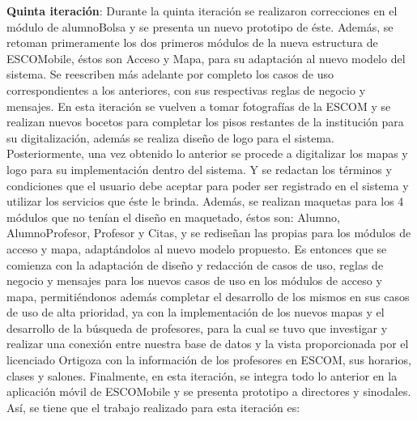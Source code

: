 \noindent
\newline
\textbf{Quinta iteración}: Durante la quinta iteración se realizaron correcciones en el módulo de alumnoBolsa y se presenta un nuevo prototipo de éste. Además, se retoman primeramente los dos primeros módulos de la nueva estructura de ESCOMobile, éstos son Acceso y Mapa, para su adaptación al nuevo modelo del sistema. Se reescriben más adelante por completo los casos de uso correspondientes a los anteriores, con sus respectivas reglas de negocio y mensajes.
\newline
En esta iteración se vuelven a tomar fotografías de la ESCOM y se realizan nuevos bocetos para completar los pisos restantes de la institución para su digitalización, además se realiza diseño de logo para el sistema. Posteriormente, una vez obtenido lo anterior se procede a digitalizar los mapas y logo para su implementación dentro del sistema. Y se redactan los términos y condiciones que el usuario debe aceptar para poder ser registrado en el sistema y utilizar los servicios que éste le brinda. 
\newline
\newline
Además, se realizan maquetas para los 4 módulos que no tenían el diseño en maquetado, éstos son: Alumno, AlumnoProfesor, Profesor y Citas, y se rediseñan las propias para los módulos de acceso y mapa, adaptándolos al nuevo modelo propuesto. 
\newline
Es entonces que se comienza con la adaptación de diseño y redacción de casos de uso, reglas de negocio y mensajes para los nuevos casos de uso en los módulos de acceso y mapa, permitiéndonos además completar el desarrollo de los mismos en sus casos de uso de alta prioridad, ya con la implementación de los nuevos mapas y el desarrollo de la búsqueda de profesores, para la cual se tuvo que investigar y realizar una conexión entre nuestra base de datos y la vista proporcionada por el licenciado Ortigoza con la información de los profesores en ESCOM, sus horarios, clases y salones.
\newline
Finalmente, en esta iteración, se integra todo lo anterior en la aplicación móvil de ESCOMobile y se presenta prototipo a directores y sinodales.
\newline
Así, se tiene que el trabajo realizado para esta iteración es: 
